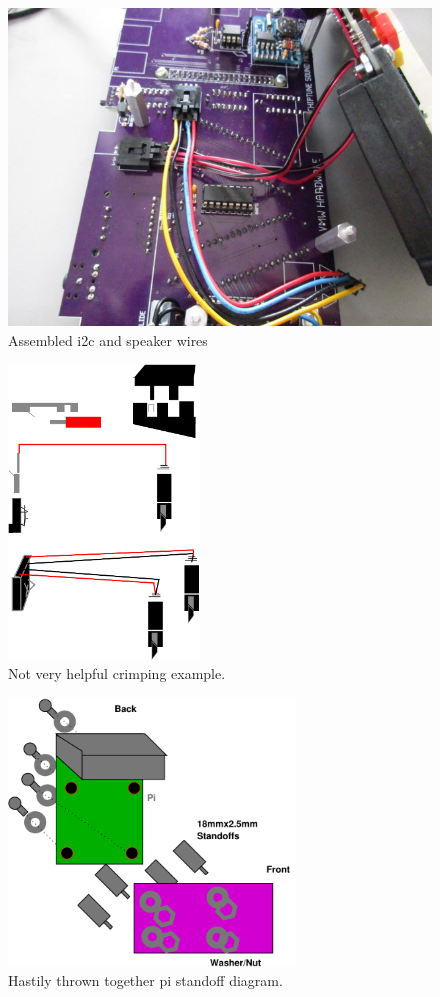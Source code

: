\documentclass[11pt]{article}
\begin{document}
\begin{figure}[tbp]
\centering
\includegraphics{figs/0369_wiring.jpg}
\caption{Assembled i2c and speaker wires~\label{figs:wires}}
\end{figure}

\begin{figure}[tbp]
\centering
\includegraphics[width=2in]{figs/power_crimp}
\caption{Not very helpful crimping example.~\label{figure:crimping}}
\end{figure}

\begin{figure}[tbp]
\centering
\includegraphics[width=3in]{figs/pi_nuts}
\caption{Hastily thrown together pi standoff diagram.~\label{figure:pi_nuts}}
\end{figure}
\end{document}

